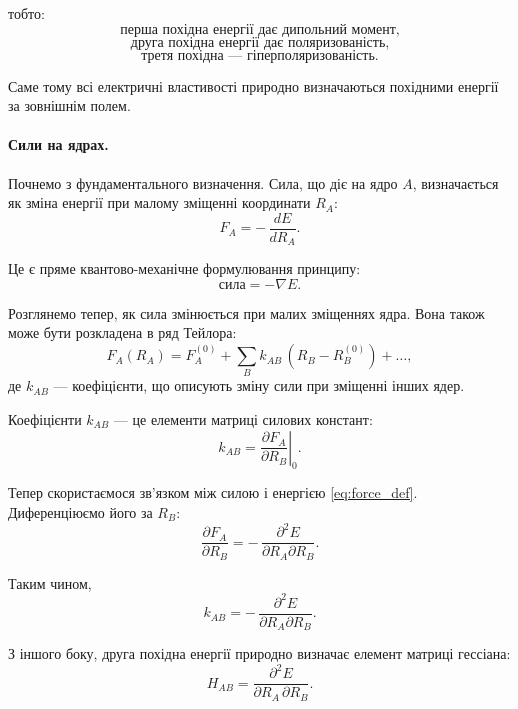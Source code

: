 \documentclass{PySCFBook}
\begin{document}
тобто:
\[
	\text{перша похідна енергії дає дипольний момент,}
\]
\[
	\text{друга похідна енергії дає поляризованість,}
\]
\[
	\text{третя похідна --- гіперполяризованість.}
\]

Саме тому всі електричні властивості природно визначаються
похідними енергії за зовнішнім полем.

\paragraph{Сили на ядрах.}

Почнемо з фундаментального визначення.
Сила, що діє на ядро $A$, визначається як зміна енергії при малому зміщенні
координати $R_A$:
\begin{equation}
	F_A = -\,\frac{dE}{dR_A}.
	\label{eq:force_def}
\end{equation}

Це є пряме квантово-механічне формулювання принципу:
\[
	\text{сила} = -\nabla E.
\]

Розглянемо тепер, як сила змінюється при малих зміщеннях ядра.
Вона також може бути розкладена в ряд Тейлора:
\begin{equation}
	F_A(R_A)
	=
	F_A^{(0)}
	+
	\sum_B k_{AB}\,(R_B - R_B^{(0)})
	+
	\dots ,
	\label{eq:force_Taylor}
\end{equation}
де $k_{AB}$ --- коефіцієнти, що описують зміну сили при зміщенні інших ядер.

Коефіцієнти $k_{AB}$ --- це елементи матриці силових констант:
\begin{equation}
	k_{AB} = \left.\frac{\partial F_A}{\partial R_B}\right|_{0}.
	\label{eq:force_constants_def}
\end{equation}

Тепер скористаємося зв’язком між силою і енергією \eqref{eq:force_def}.
Диференціюємо його за $R_B$:
\begin{equation}
	\frac{\partial F_A}{\partial R_B}
	=
	-\,\frac{\partial^2 E}{\partial R_A \partial R_B}.
	\label{eq:F_derivative_relation}
\end{equation}

Таким чином,
\[
	k_{AB} = -\,\frac{\partial^2 E}{\partial R_A \partial R_B}.
\]

З іншого боку, друга похідна енергії природно визначає елемент матриці гессіана:
\begin{equation}
	H_{AB} =
	\frac{\partial^2 E}{\partial R_A\,\partial R_B}.
	\label{eq:nuclear_Hessian_def_fixed}
\end{equation}
\end{document}
